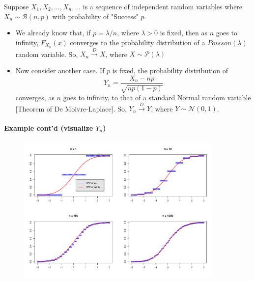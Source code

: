 \documentclass[notes=show,smaller,handout]{beamer}\usepackage[]{graphicx}\usepackage[]{color}
\begin{document}
\begin{frame}{\secname}
  \begin{example}
  \begin{footnotesize}
  Suppose $X_{1},X_{2},...,X_{n},...$ is a sequence of independent
  random variables where $X_n\sim \mathcal{B}(n,p)$ with probability of "Success" $p$.\bigskip

  \begin{itemize}

  \item We already know that, if $p=\lambda/n$, where $\lambda>0$ is fixed, then as $n$ goes to infinity, $F_{X_{n}}\left( x\right) $ converges to
  the probability distribution of a \color{blue}$Poisson\left( \lambda \right) $ \color{black} random variable. So, $X_{n}\overset{D}{\rightarrow }X$, where $X\sim \mathcal{P}\left(\lambda \right) $\bigskip

  \item Now consider another case. If $p$ is fixed, the probability distribution of
  \begin{equation*}
  Y_{n}=\frac{X_{n}-np}{\sqrt{np\left( 1-p\right) }}
  \end{equation*}
  converges, as $n$ goes to infinity, to that of a \color{blue}standard Normal \color{black} random variable [Theorem of De Moivre-Laplace]. So, $Y_
  {n}\overset{D}{\rightarrow }Y$, where $Y\sim \mathcal{N}\left(0,1\right) $.

  \end{itemize}
  \end{footnotesize}
  \end{example}
\end{frame}%

\begin{frame}{\secname}
  \framesubtitle{Example cont'd (visualize $Y_{n}$)}

  \begin{example}


  \begin{figure}[ptb]\centering
  \includegraphics[height=2.9in, width=4in]{img/CDF_Rplot.pdf}%
  \end{figure}
  \end{example}
\end{frame}
\end{document}
